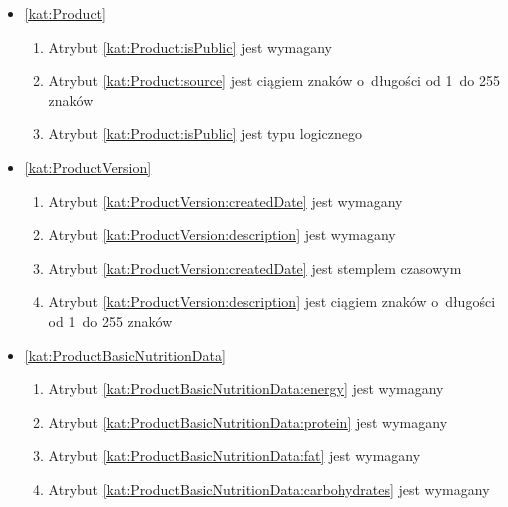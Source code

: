 \begin{itemize}[label={\textbf{Ograniczenia dla}}, wide, labelwidth=!, labelindent=0pt]
    \setlength\itemsep{1.75em}
    \item\ref{kat:Product}\mynobreakpar
    \begin{enumerate}[label={\textbf{OGR/1/\protect\twodigits{\arabic{enumi}}}}, wide, labelwidth=!, align=left, leftmargin=3cm]
        \item Atrybut \ref{kat:Product:isPublic} jest wymagany

        \item Atrybut \ref{kat:Product:source} jest ciągiem znaków o~długości od 1~do 255 znaków
        \item Atrybut \ref{kat:Product:isPublic} jest typu logicznego
    \end{enumerate}

    \item\ref{kat:ProductVersion}\mynobreakpar
    \begin{enumerate}[label={\textbf{OGR/1/\protect\twodigits{\arabic{enumi}}}}, wide, labelwidth=!, align=left, leftmargin=3cm, resume]
        \item Atrybut \ref{kat:ProductVersion:createdDate} jest wymagany
        \item Atrybut \ref{kat:ProductVersion:description} jest wymagany

        \item Atrybut \ref{kat:ProductVersion:createdDate} jest stemplem czasowym
        \item Atrybut \ref{kat:ProductVersion:description} jest ciągiem znaków o~długości od 1~do 255 znaków
    \end{enumerate}

    \item\ref{kat:ProductBasicNutritionData}\mynobreakpar
    \begin{enumerate}[label={\textbf{OGR/1/\protect\twodigits{\arabic{enumi}}}}, wide, labelwidth=!, align=left, leftmargin=3cm, resume]
        \item Atrybut \ref{kat:ProductBasicNutritionData:energy} jest wymagany
        \item Atrybut \ref{kat:ProductBasicNutritionData:protein} jest wymagany
        \item Atrybut \ref{kat:ProductBasicNutritionData:fat} jest wymagany
        \item Atrybut \ref{kat:ProductBasicNutritionData:carbohydrates} jest wymagany


\end{enumerate}
\end{itemize}
